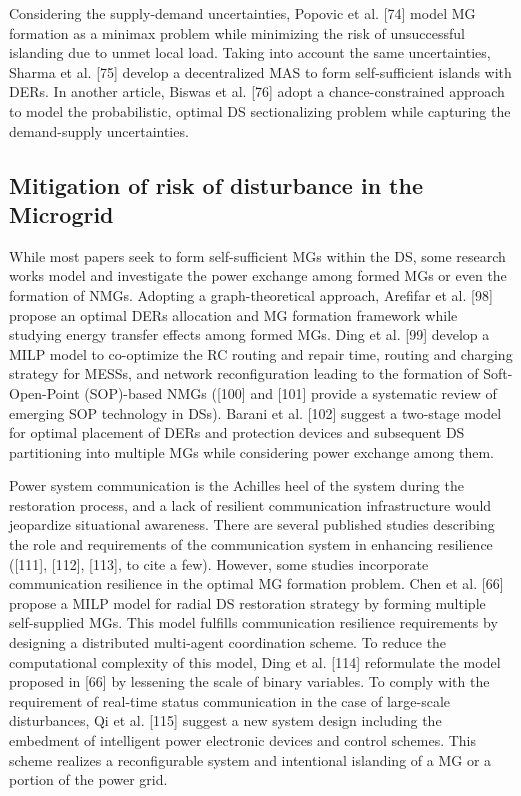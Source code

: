 \documentclass[conference]{IEEEtran}
\begin{document}
Considering the supply-demand uncertainties, Popovic et al. [74] model MG formation as a minimax problem while minimizing the risk of unsuccessful islanding due to unmet local load. Taking into account the same uncertainties, Sharma et al. [75] develop a decentralized MAS to form self-sufficient islands with DERs. In another article, Biswas et al. [76] adopt a chance-constrained approach to model the probabilistic, optimal DS sectionalizing problem while capturing the demand-supply uncertainties.

\subsection{Mitigation of risk of disturbance in the Microgrid}
While most papers seek to form self-sufficient MGs within the DS, some research works model and investigate the power exchange among formed MGs or even the formation of NMGs. Adopting a graph-theoretical approach, Arefifar et al. [98] propose an optimal DERs allocation and MG formation framework while studying energy transfer effects among formed MGs. Ding et al. [99] develop a MILP model to co-optimize the RC routing and repair time, routing and charging strategy for MESSs, and network reconfiguration leading to the formation of Soft-Open-Point (SOP)-based NMGs ([100] and [101] provide a systematic review of emerging SOP technology in DSs). Barani et al. [102] suggest a two-stage model for optimal placement of DERs and protection devices and subsequent DS partitioning into multiple MGs while considering power exchange among them.

Power system communication is the Achilles heel of the system during the restoration process, and a lack of resilient communication infrastructure would jeopardize situational awareness. There are several published studies describing the role and requirements of the communication system in enhancing resilience ([111], [112], [113], to cite a few). However, some studies incorporate communication resilience in the optimal MG formation problem. Chen et al. [66] propose a MILP model for radial DS restoration strategy by forming multiple self-supplied MGs. This model fulfills communication resilience requirements by designing a distributed multi-agent coordination scheme. To reduce the computational complexity of this model, Ding et al. [114] reformulate the model proposed in [66] by lessening the scale of binary variables. To comply with the requirement of real-time status communication in the case of large-scale disturbances, Qi et al. [115] suggest a new system design including the embedment of intelligent power electronic devices and control schemes. This scheme realizes a reconfigurable system and intentional islanding of a MG or a portion of the power grid.
\end{document}
